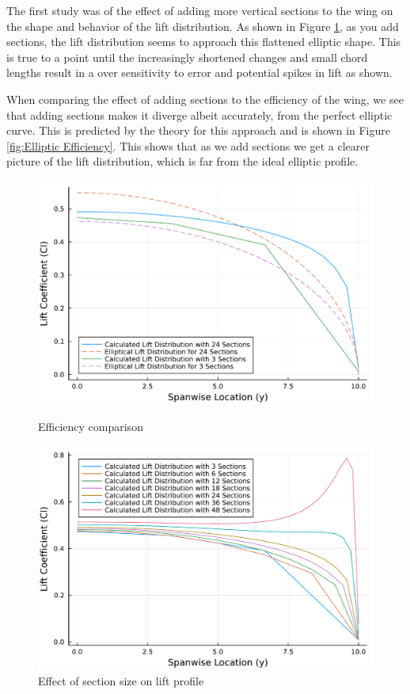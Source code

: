 \documentclass{article}
\begin{document}
The first study was of the effect of adding more vertical sections to the wing on the shape and behavior of the lift distribution. As shown in Figure \ref{fig:Elliptic wing lift profile}, as you add sections, the lift distribution seems to approach this flattened elliptic shape. This is true to a point until the increasingly shortened changes and small chord lengths result in a over sensitivity to error and potential spikes in lift as shown.

When comparing the effect of adding sections to the efficiency of the wing, we see that adding sections makes it diverge albeit accurately, from the perfect elliptic curve. This is predicted by the theory for this approach and is shown in Figure \ref{fig:Elliptic Efficiency}. This shows that as we add sections we get a clearer picture of the lift distribution, which is far from the ideal elliptic profile.

\begin{figure}[h]
    \centering
\begin{minipage}[b]{0.45\textwidth}
\centering
\includegraphics[width=\textwidth]{Lift_Distribution_along_the_Span.pdf}
\caption{Efficiency comparison}
\label{fig:Elliptic Efficiency}
\end{minipage}
\begin{minipage}[b]{0.45\textwidth}
\centering
\includegraphics[width=\textwidth]{Lift_Distribution_along_the_Span_Increments.pdf}
\caption{Effect of section size on lift profile}
\label{fig:Elliptic wing lift profile}
\end{minipage}
\end{figure}
\end{document}

